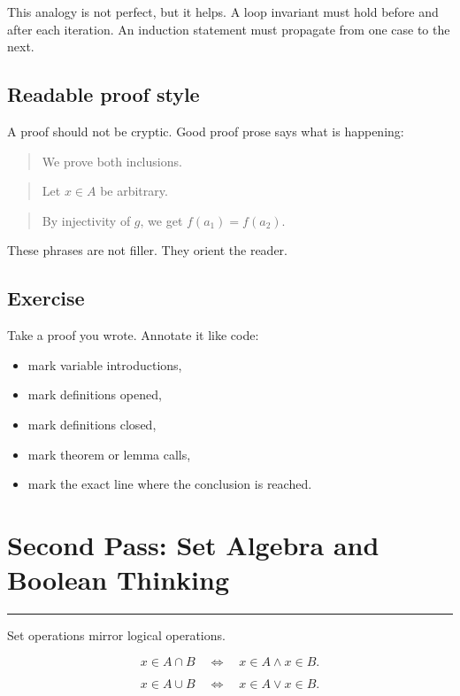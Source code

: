 \documentclass[12pt]{article}
\newcommand{\chapterline}{\vspace{0.4em}\hrule\vspace{0.8em}}
\begin{document}
This analogy is not perfect, but it helps. A loop invariant must hold before and after each iteration. An induction statement must propagate from one case to the next.

\subsection{Readable proof style}

A proof should not be cryptic. Good proof prose says what is happening:

\begin{quote}
We prove both inclusions.
\end{quote}

\begin{quote}
Let $x\in A$ be arbitrary.
\end{quote}

\begin{quote}
By injectivity of $g$, we get $f(a_1)=f(a_2)$.
\end{quote}

These phrases are not filler. They orient the reader.

\subsection{Exercise}

Take a proof you wrote. Annotate it like code:

\begin{itemize}
\item mark variable introductions,
\item mark definitions opened,
\item mark definitions closed,
\item mark theorem or lemma calls,
\item mark the exact line where the conclusion is reached.
\end{itemize}

\newpage
\section{Second Pass: Set Algebra and Boolean Thinking}
\chapterline

Set operations mirror logical operations.

\[
x\in A\cap B\quad\Longleftrightarrow\quad x\in A\land x\in B.
\]

\[
x\in A\cup B\quad\Longleftrightarrow\quad x\in A\lor x\in B.
\]
\end{document}
